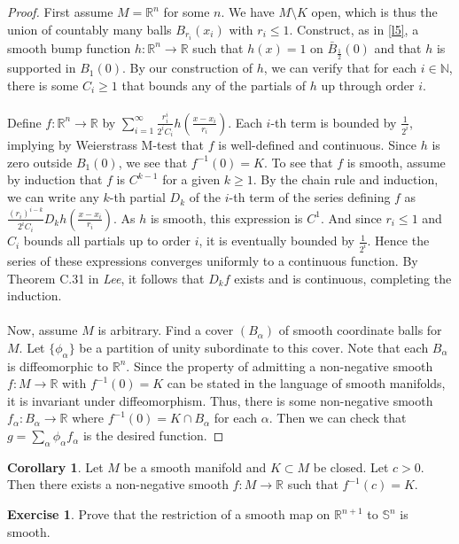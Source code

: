 \documentclass[10pt,letterpaper,cm]{nupset}
\theoremstyle{definition}
\theoremstyle{theorem}
\newtheorem{corollary}[definition]{Corollary}
\newtheorem{exercise}[definition]{Exercise}
\theoremstyle{remark}
\newcommand{\N}{\mathbb N}
\newcommand{\R}{\mathbb R}
\renewcommand{\S}{\mathbb S}
\newcommand{\1}{\mathbf{1}}
\newcommand{\0}{\vec 0}
\begin{document}
\begin{proof}
First assume $M=\R^n$ for some $n$. We have $M\setminus K$ open, which is thus the union of countably many balls $B_{r_i}(x_i)$ with $r_i \leq 1$. Construct, as in \cref{l5}, a smooth bump function $h: \R^n \to \R$ such that
 $h(x) =1$ on $\bar{B}_{\frac{1}{2}}(0)$ and that $h$ is supported in $B_1(0)$.  By our construction of $h$, we can verify that for each $i\in \N$, there is some $C_i \geq 1$ that bounds any of the partials of $h$ up through order $i$. 
 \\ \\ Define $f: \R^n \to \R$ by $\sum_{i=1}^\infty \frac{r_i^i}{2^iC_i}h (\frac{x-x_i}{r_i})$. Each $i$-th term is bounded by $\frac{1}{2^i}$, implying by Weierstrass M-test that $f$ is well-defined and continuous. Since $h$ is zero outside $B_1(0)$, we see that $f^{-1}(0) = K$. To see that $f$ is smooth, assume by induction that $f$ is $C^{k-1}$ for a given $k \geq 1$. By the chain rule and induction, we can write any $k$-th partial $D_k$ of the $i$-th term of the series defining $f$ as $\frac{(r_i)^{i-k}}{2^iC_i} D_kh(\frac{x-x_i}{r_i})$. As $h$ is smooth, this expression is $C^1$. And since $r_i \leq 1$ and $C_i$ bounds all partials up to order $i$, it is eventually bounded by $\frac{1}{2^i}$. Hence the series of these expressions converges uniformly to a continuous function. By Theorem C.31 in \textit{Lee}, it follows that $D_kf$ exists and is continuous, completing the induction. 
\\ \\ Now, assume $M$ is arbitrary. Find a cover $(B_\alpha)$ of smooth coordinate balls for $M$. Let $\{\phi_\alpha\}$ be a partition of unity subordinate to this cover. Note that each $B_\alpha$ is diffeomorphic to $\R^n$. Since the property of admitting a non-negative smooth $f: M \to \R$ with $f^{-1}(0) = K$ can be stated in the language of smooth manifolds, it is invariant under diffeomorphism. Thus, there is some non-negative smooth $f_\alpha : B_\alpha \to \R$ where $f^{-1}(0) = K \cap B_\alpha$ for each $\alpha$. Then we can check that $g = \sum_{\alpha} \phi_\alpha f_\alpha$ is the desired function.
\end{proof}

\begin{corollary}
Let $M$ be a smooth manifold and $K \subset M$ be closed. Let $c >0$. Then there exists a non-negative smooth $f: M \to \R$ such that $f^{-1}(c) =K$.
\end{corollary}

\begin{exercise}
Prove that the restriction of a smooth map on $\R^{n+1}$ to $\S^n$ is smooth. 
\end{exercise}
\end{document}
